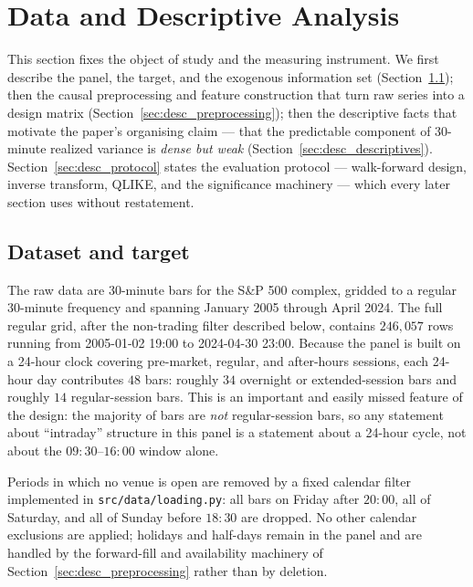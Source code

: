 \section{Data and Descriptive Analysis}
\label{sec:descriptive}

This section fixes the object of study and the measuring instrument. We first
describe the panel, the target, and the exogenous information set
(Section~\ref{sec:desc_dataset}); then the causal preprocessing and feature
construction that turn raw series into a design matrix
(Section~\ref{sec:desc_preprocessing}); then the descriptive facts that motivate
the paper's organising claim --- that the predictable component of 30-minute
realized variance is \emph{dense but weak} (Section~\ref{sec:desc_descriptives}).
Section~\ref{sec:desc_protocol} states the evaluation protocol --- walk-forward
design, inverse transform, QLIKE, and the significance machinery --- which every
later section uses without restatement.

\subsection{Dataset and target}
\label{sec:desc_dataset}

The raw data are 30-minute bars for the S\&P 500 complex, gridded to a regular
30-minute frequency and spanning January 2005 through April 2024. The full
regular grid, after the non-trading filter described below, contains
$246{,}057$ rows running from 2005-01-02 19:00 to 2024-04-30 23:00.
Because the panel is built on a 24-hour clock covering pre-market, regular, and
after-hours sessions, each 24-hour day contributes $48$ bars: roughly $34$
overnight or extended-session bars and roughly $14$ regular-session bars.
This is an important and easily missed feature of the design: the majority of
bars are \emph{not} regular-session bars, so any statement about ``intraday''
structure in this panel is a statement about a 24-hour cycle, not about the
$09{:}30$--$16{:}00$ window alone.

Periods in which no venue is open are removed by a fixed calendar filter
implemented in \texttt{src/data/loading.py}: all bars on Friday after
$20{:}00$, all of Saturday, and all of Sunday before $18{:}30$ are dropped. No
other calendar exclusions are applied; holidays and half-days remain in the
panel and are handled by the forward-fill and availability machinery of
Section~\ref{sec:desc_preprocessing} rather than by deletion.

